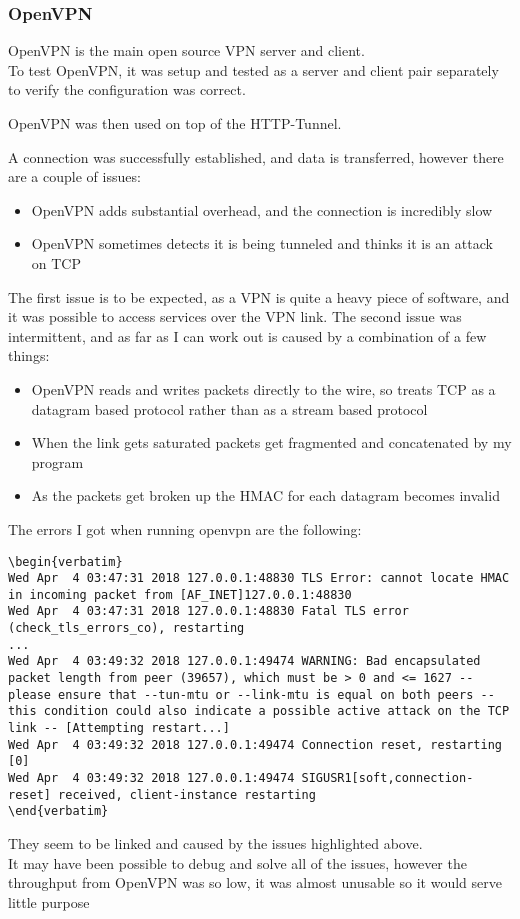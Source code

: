 \subsubsection{OpenVPN}
OpenVPN is the main open source VPN server and client.\\
To test OpenVPN, it was setup and tested as a server and client pair separately to verify the configuration was correct.\par
OpenVPN was then used on top of the HTTP-Tunnel.\par
A connection was successfully established, and data is transferred, however there are a couple of issues:
\begin{itemize}
    \item OpenVPN adds substantial overhead, and the connection is incredibly slow
    \item OpenVPN sometimes detects it is being tunneled and thinks it is an attack on TCP
\end{itemize}
The first issue is to be expected, as a VPN is quite a heavy piece of software, and it was possible to access services over the VPN link.
The second issue was intermittent, and as far as I can work out is caused by a combination of a few things:
\begin{itemize}
    \item OpenVPN reads and writes packets directly to the wire, so treats TCP as a datagram based protocol rather than as a stream based protocol
    \item When the link gets saturated packets get fragmented and concatenated by my program
    \item As the packets get broken up the HMAC for each datagram becomes invalid
\end{itemize}
The errors I got when running openvpn are the following:
\begin{lstlisting}[language=none,numbers=none,firstline=2,lastline=7]
\begin{verbatim}
Wed Apr  4 03:47:31 2018 127.0.0.1:48830 TLS Error: cannot locate HMAC in incoming packet from [AF_INET]127.0.0.1:48830
Wed Apr  4 03:47:31 2018 127.0.0.1:48830 Fatal TLS error (check_tls_errors_co), restarting
...
Wed Apr  4 03:49:32 2018 127.0.0.1:49474 WARNING: Bad encapsulated packet length from peer (39657), which must be > 0 and <= 1627 -- please ensure that --tun-mtu or --link-mtu is equal on both peers -- this condition could also indicate a possible active attack on the TCP link -- [Attempting restart...]
Wed Apr  4 03:49:32 2018 127.0.0.1:49474 Connection reset, restarting [0]
Wed Apr  4 03:49:32 2018 127.0.0.1:49474 SIGUSR1[soft,connection-reset] received, client-instance restarting
\end{verbatim}
\end{lstlisting}
They seem to be linked and caused by the issues highlighted above.\\
It may have been possible to debug and solve all of the issues, however the throughput from OpenVPN was so low, it was almost unusable so it would serve little purpose

